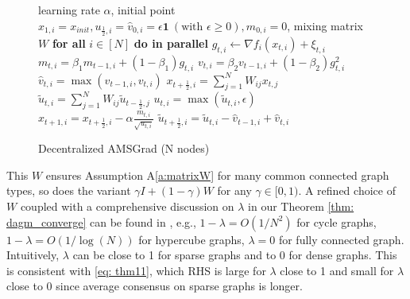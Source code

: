 \documentclass[anon,12pt]{colt2021} %
\begin{document}
\begin{figure}\vspace{-0.8cm}
\begin{minipage}{\linewidth}
\begin{algorithm}[H]
\caption{Decentralized AMSGrad (N nodes)}
\label{alg: damsgrad}
	\begin{algorithmic}[1]
		 learning rate $\alpha$, initial point $x_{1,i} = x_{init}, u_{\frac{1}{2},i} = \hat v_{0,i} = \epsilon \mathbf 1\ (\text{with } \epsilon \geq 0), m_{0,i}=0$, mixing matrix $W$ 
		\STATE \textbf{for all }$i \in [N]$ \textbf{do in parallel}
		\STATE \quad $g_{t,i}  \leftarrow \nabla f_i(x_{t,i}) + \xi_{t,i}$
		\STATE \quad $m_{t,i} = \beta_1 m_{t-1,i} + (1-\beta_1) g_{t,i}$ 
		\STATE \quad  $ v_{t,i} = \beta_2 v_{t-1,i} + (1-\beta_2) g_{t,i}^2 $
		\STATE  \quad $\hat v_{t,i} = \max (\hat v_{t-1,i}, v_{t,i} )$
		\STATE \quad $x_{t+\frac{1}{2},i} = \sum_{j=1}^N W_{ij}x_{t,j}$
		\STATE \quad $\tilde u_{t,i} = \sum_{j=1}^N W_{ij}\tilde u_{t-\frac{1}{2},j}$
	    \STATE \quad $u_{t,i} = \max(\tilde u_{t,i}, \epsilon)$
		\STATE \quad $x_{t+1,i} = x_{t+\frac{1}{2},i} - \alpha \frac{m_{t,i}}{\sqrt{u_{t,i}}}$
		\STATE \quad $\tilde u_{t+\frac{1}{2},i} = \tilde u_{t,i} - \hat v_{t-1,i} + \hat v_{t,i}$
		\ENDFOR
	\end{algorithmic}
\end{algorithm}
\end{minipage}
\end{figure}
This $W$ ensures Assumption A\ref{a:matrixW} for many common connected graph types, so does the variant $\gamma I + (1-\gamma) W$ for any $\gamma \in [0,1)$.  
A refined choice of $W$ coupled with a comprehensive discussion on $\lambda$ in our Theorem \ref{thm: dagm_converge} can be found in \cite{boyd2009fastest}, e.g., $1-\lambda =O(1/N^2)$ for cycle graphs, $1-\lambda =O(1/\log(N))$ for hypercube graphs, $\lambda = 0$ for fully connected graph. 
Intuitively, $\lambda$ can be close to 1 for sparse graphs and to 0 for dense graphs.
This is consistent with \eqref{eq: thm11}, which RHS is large for $\lambda$ close to 1 and small for $\lambda $ close to 0 since average consensus on sparse graphs is longer.


\end{document}
